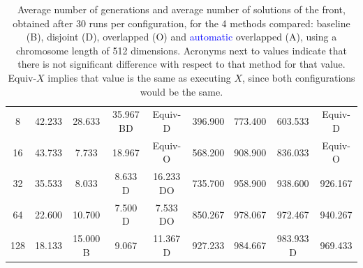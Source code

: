 \documentclass[preprint]{elsarticle}
\begin{document}
\begin{table}
{\begin{tabular}{|c||c|c|c|c||c|c|c|c||}
8	&	42.233		&	28.633		&	35.967	BD		&	Equiv-D			&	396.900		&	773.400			&	603.533			&	Equiv-D				\\
16	&	43.733		&	7.733		&	18.967			&	Equiv-O			&	568.200		&	908.900			&	836.033			&	Equiv-O				\\
32	&	35.533		&	8.033		&	8.633	D		&	16.233		DO	&	735.700		&	958.900			&	938.600			&	926.167				\\
64	&	22.600		&	10.700		&	7.500	D		&	7.533		DO	&	850.267		&	978.067			&	972.467			&	940.267				\\
128	&	18.133		&	15.000	B	&	9.067			&	11.367		D	&	927.233		&	984.667			&	983.933	D		&	969.433				\\ \hline
\end{tabular}
}
\caption{Average number of generations and average number of solutions of the front, obtained after 30 runs per configuration, for the 4 methods compared: baseline (B), disjoint (D), overlapped (O) and \textcolor{blue}{automatic} overlapped (A), using a chromosome length of 512 dimensions. Acronyms next to values indicate that there is not significant difference with respect to that method for that value. Equiv-$X$ implies that value is the same as executing $X$, since both configurations would be the same.}
\label{tab:sols512}
\end{table}
\end{document}
